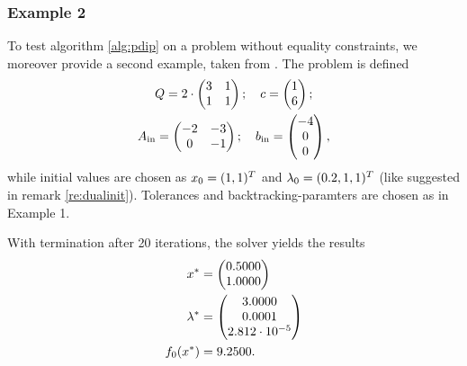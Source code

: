 \subsubsection{Example 2 }
To test algorithm \eqref{alg:pdip} on a problem without equality constraints, we moreover provide a second example, taken from \cite{EX}. The problem is defined
\begin{gather*}
		Q = 2\cdot \begin{pmatrix}
	3 & 1\\ 1 & 1
	\end{pmatrix}; \quad c = \begin{pmatrix} {1} \\ {6} \end{pmatrix};\\
	{A}_{\mathrm{{ in}}} = \begin{pmatrix}
	-2 & -3 \\ 0& -1
	\end{pmatrix}; \quad {b}_{\mathrm{{ in}}}= \begin{pmatrix}
	-4\\0\\0
	\end{pmatrix},
\end{gather*}
while initial values are chosen as $ x_0 = (1,1)^T $ and $ \lambda_0 = (0.2,1,1)^T $ (like suggested in remark \ref{re:dualinit}). Tolerances and backtracking-paramters are chosen as in Example 1.

With termination after 20 iterations, the solver yields the results
\begin{align}
	x^* &= \begin{pmatrix} {0.5000} \\ {1.0000} \end{pmatrix}\\
	\lambda^* &= \begin{pmatrix} {3.0000} \\ {0.0001} \\ {2.812\cdot 10^{-5}} \end{pmatrix}\\
	f_0(x^*) &= 9.2500.
\end{align}
